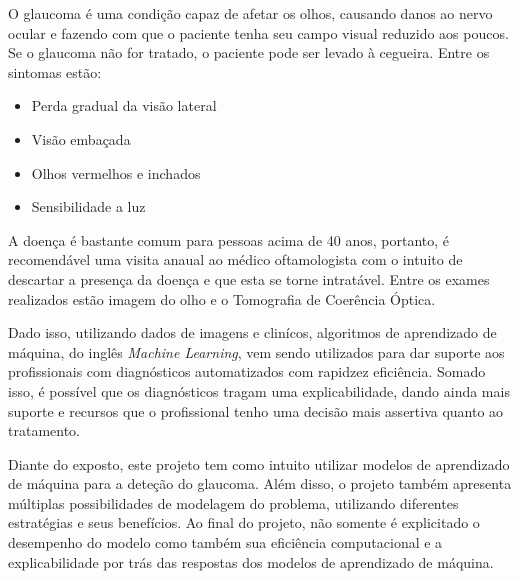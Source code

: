 O glaucoma é uma condição capaz de afetar os olhos, causando danos ao nervo ocular
e fazendo com que o paciente tenha seu campo visual reduzido aos poucos.
Se o glaucoma não for tratado, o paciente pode ser levado à cegueira. Entre os sintomas estão:
\begin{itemize}
    \item Perda gradual da visão lateral
    \item Visão embaçada
    \item Olhos vermelhos e inchados
    \item Sensibilidade a luz
\end{itemize}
A doença é bastante comum para pessoas acima de 40 anos, portanto, é recomendável uma visita anaual
ao médico oftamologista com o intuito de descartar a presença da doença e que esta se torne
intratável. Entre os exames realizados estão imagem do olho e o Tomografia de Coerência Óptica.

Dado isso, utilizando dados de imagens e clinícos, algoritmos de aprendizado de máquina, do
inglês \textit{Machine Learning}, vem sendo utilizados para dar suporte aos profissionais com
diagnósticos automatizados com rapidzez eficiência. Somado isso, é possível que os diagnósticos
tragam uma explicabilidade, dando ainda mais suporte e recursos que o profissional tenho uma decisão
mais assertiva quanto ao tratamento.

Diante do exposto, este projeto tem como intuito utilizar modelos de aprendizado de máquina para a
deteção do glaucoma. Além disso, o projeto também apresenta múltiplas possibilidades de modelagem do
problema, utilizando diferentes estratégias e seus benefícios. Ao final do projeto, não
somente é explicitado o desempenho do modelo como também sua eficiência computacional e a
explicabilidade por trás das respostas dos modelos de aprendizado de máquina.


